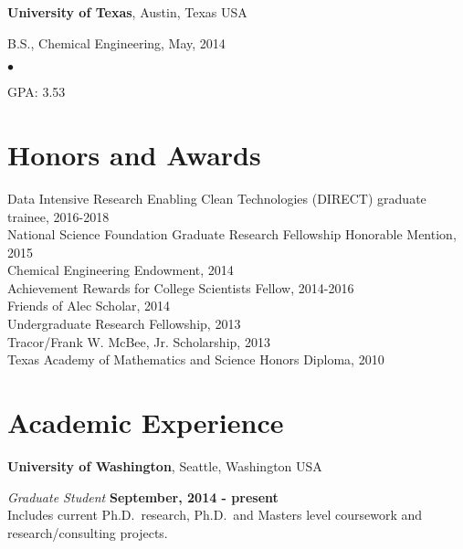 \documentclass[margin,line]{res}
\newenvironment{list1}{
  \begin{list}{\ding{113}}{%
      \setlength{\itemsep}{0in}
      \setlength{\parsep}{0in} \setlength{\parskip}{0in}
      \setlength{\topsep}{0in} \setlength{\partopsep}{0in} 
      \setlength{\leftmargin}{0.17in}}}{\end{list}}
\newenvironment{list2}{
  \begin{list}{$\bullet$}{%
      \setlength{\itemsep}{0in}
      \setlength{\parsep}{0in} \setlength{\parskip}{0in}
      \setlength{\topsep}{0in} \setlength{\partopsep}{0in} 
      \setlength{\leftmargin}{0.2in}}}{\end{list}}
\begin{document}
\begin{resume}
{\bf University of Texas}, Austin, Texas USA\\
\vspace*{-.1in}
\begin{list1}
\item[] B.S., Chemical Engineering,  May, 2014
\begin{list2}
\vspace*{.05in}
\item GPA: 3.53
\end{list2}
\end{list1}

\section{\sc Honors and Awards} 

\vspace*{.05in}
Data Intensive Research Enabling Clean Technologies (DIRECT) graduate trainee, 2016-2018\\
\vspace*{.05in}
National Science Foundation Graduate Research Fellowship Honorable Mention, 2015\\
\vspace*{.05in}
Chemical Engineering Endowment, 2014\\
\vspace*{.05in}
Achievement Rewards for College Scientists Fellow, 2014-2016\\
\vspace*{.05in}
Friends of Alec Scholar, 2014\\
\vspace*{.05in}
Undergraduate Research Fellowship, 2013\\
\vspace*{.05in}
Tracor/Frank W. McBee, Jr. Scholarship, 2013\\
\vspace*{.05in}
Texas Academy of Mathematics and Science Honors Diploma, 2010\\

\section{\sc Academic Experience}
{\bf University of Washington}, Seattle, Washington USA

\vspace{-.3cm}
{\em Graduate Student} \hfill {\bf September, 2014 - present}\\
Includes current Ph.D.~research, Ph.D.~and Masters level coursework and research/consulting projects.


\end{resume}
\end{document}
